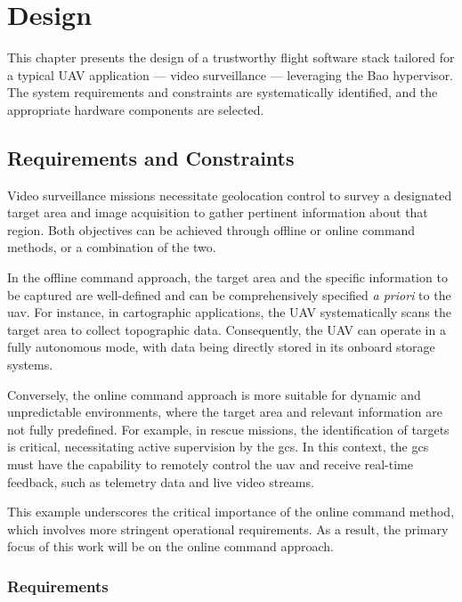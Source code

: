 %
\chapter{Design}%
\label{ch:design}

This chapter presents the design of a trustworthy flight software stack tailored
for a typical UAV application --- video surveillance --- leveraging the Bao
hypervisor. The system requirements and constraints are systematically
identified, and the appropriate hardware components are selected.


\section{Requirements and Constraints}
\label{sec:req-sec}
Video surveillance missions necessitate geolocation control to survey a
designated target area and image acquisition to gather pertinent information
about that region. Both objectives can be achieved through offline or online
command methods, or a combination of the two.

In the offline command approach, the target area and the specific information to
be captured are well-defined and can be comprehensively specified \emph{a
priori} to the \gls{uav}. For instance, in cartographic applications, the UAV
systematically scans the target area to collect topographic data. Consequently,
the UAV can operate in a fully autonomous mode, with data being directly stored
in its onboard storage systems.

Conversely, the online command approach is more suitable for dynamic and
unpredictable environments, where the target area and relevant information are
not fully predefined. For example, in rescue missions, the identification of
targets is critical, necessitating active supervision by the \gls{gcs}. In this
context, the \gls{gcs} must have the capability to remotely control the \gls{uav} and receive real-time feedback, such as telemetry data and live video streams.

This example underscores the critical importance of the online command method,
which involves more stringent operational requirements. As a result, the primary
focus of this work will be on the online command approach.

\subsection{Requirements}
\label{sec:req}

